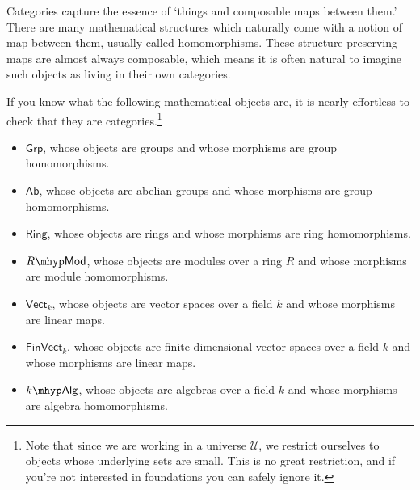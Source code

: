 \documentclass[notes.tex]{subfiles}
\begin{document}
\begin{example}
\begin{itemize}

  \end{itemize}
\end{example}

Categories capture the essence of `things and composable maps between them.' There are many mathematical structures which naturally come with a notion of map between them, usually called homomorphisms. These structure preserving maps are almost always composable, which means it is often natural to imagine such objects as living in their own categories.
\begin{example}
  \label{eg:examplesofcategories}
  If you know what the following mathematical objects are, it is nearly effortless to check that they are categories.\footnote{Note that since we are working in a universe $\mathcal{U}$, we restrict ourselves to objects whose underlying sets are small. This is no great restriction, and if you're not interested in foundations you can safely ignore it.}
  \begin{itemize}
    \item $\mathsf{Grp}$, whose objects are groups and whose morphisms are group homomorphisms.

    \item\label{item:categoryab} $\mathsf{Ab}$, whose objects are abelian groups and whose morphisms are group homomorphisms.

    \item $\mathsf{Ring}$, whose objects are rings and whose morphisms are ring homomorphisms.

    \item $R\mhyp\mathsf{Mod}$, whose objects are modules over a ring $R$ and whose morphisms are module homomorphisms.

    \item $\mathsf{Vect}_{k}$, whose objects are vector spaces over a field $k$ and whose morphisms are linear maps.
    \item $\mathsf{FinVect}_{k}$, whose objects are finite-dimensional vector spaces over a field $k$ and whose morphisms are linear maps.
    \item $k\mhyp\mathsf{Alg}$, whose objects are algebras over a field $k$ and whose morphisms are algebra homomorphisms.
  \end{itemize}
\end{example}
\end{document}
